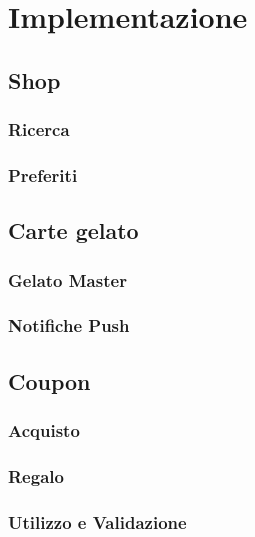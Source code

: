 \section{Implementazione}

\subsection{Shop}

\subsubsection{Ricerca}

\subsubsection{Preferiti}


\subsection{Carte gelato}

\subsubsection{Gelato Master}

\subsubsection{Notifiche Push}

\subsection{Coupon}

\subsubsection{Acquisto}

\subsubsection{Regalo}

\subsubsection{Utilizzo e Validazione}

\newpage